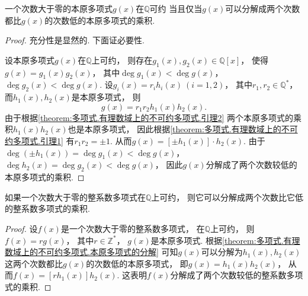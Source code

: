 \begin{theorem}\label{theorem:多项式.有理数域上的不可约多项式.本原多项式的分解}
一个次数大于零的本原多项式\(g(x)\)在\(\mathbb{Q}\)可约
当且仅当\(g(x)\)可以分解成两个次数都比\(g(x)\)的次数低的本原多项式的乘积.
\begin{proof}
充分性是显然的.
下面证必要性.

设本原多项式\(g(x)\)在\(\mathbb{Q}\)上可约，
则存在\(g_1(x),g_2(x)\in\mathbb{Q}[x]\)，
使得\(g(x) = g_1(x) g_2(x)\)，
其中\(\deg g_1(x) < \deg g(x)\)，
\(\deg g_2(x) < \deg g(x)\).
设\(g_i(x)=r_i h_i(x)\ (i=1,2)\)，
其中\(r_1,r_2\in\mathbb{Q}^*\)，
而\(h_1(x),h_2(x)\)是本原多项式，
则\begin{equation*}
	g(x) = r_1 r_2 h_1(x) h_2(x).
\end{equation*}
由于根据\cref{theorem:多项式.有理数域上的不可约多项式.引理2}
两个本原多项式的乘积\(h_1(x) h_2(x)\)也是本原多项式，
因此根据\cref{theorem:多项式.有理数域上的不可约多项式.引理1}
有\(r_1 r_2 = \pm1\).
从而\(g(x)=[\pm h_1(x)]\cdot h_2(x)\).
由于\(\deg(\pm h_1(x))
= \deg g_1(x)
< \deg g(x)\)，
\(\deg h_2(x)
= \deg g_2(x)
< \deg g(x)\)，
因此\(g(x)\)分解成了两个次数较低的本原多项式的乘积.
\end{proof}
\end{theorem}

\begin{corollary}\label{theorem:多项式.有理数域上的不可约多项式.本原多项式的分解.推论}
如果一个次数大于零的整系数多项式在\(\mathbb{Q}\)上可约，
则它可以分解成两个次数比它低的整系数多项式的乘积.
\begin{proof}
设\(f(x)\)是一个次数大于零的整系数多项式，
在\(\mathbb{Q}\)上可约，
则\(f(x)= r g(x)\)，
其中\(r\in\mathbb{Z}^*\)，
\(g(x)\)是本原多项式.
根据\cref{theorem:多项式.有理数域上的不可约多项式.本原多项式的分解}
可知\(g(x)\)可以分解为\(h_1(x),h_2(x)\)
这两个次数都比\(g(x)\)的次数低的本原多项式，
即\(g(x)=h_1(x) h_2(x)\)，
从而\(f(x)=[r h_1(x)] h_2(x)\).
这表明\(f(x)\)分解成了两个次数较低的整系数多项式的乘积.
\end{proof}
\end{corollary}

